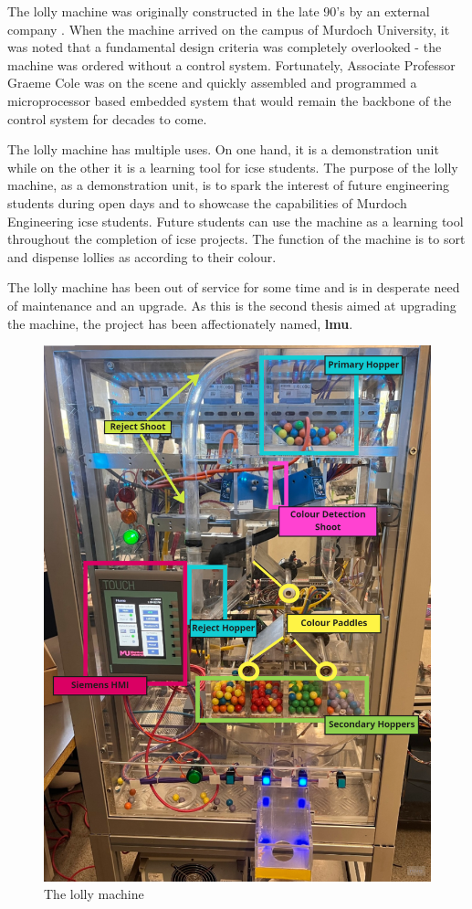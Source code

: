 The lolly machine was originally constructed in the late 90's by an external company \cite{computerControlGCole}. When the machine arrived on the campus of Murdoch University, it was noted that a fundamental design criteria was completely overlooked - the machine was ordered without a control system. Fortunately, Associate Professor Graeme Cole was on the scene and quickly assembled and programmed a microprocessor based embedded system that would remain the backbone of the control system for decades to come. 

The lolly machine has multiple uses. On one hand, it is a demonstration unit while on the other it is a learning tool for \acrshort{icse} students. The purpose of the lolly machine, as a demonstration unit, is to spark the interest of future engineering students during open days and to showcase the capabilities of Murdoch Engineering \acrlong{icse} students. Future students can use the machine as a learning tool throughout the completion of \acrshort{icse} projects. 
The function of the machine is to sort and dispense lollies as according to their colour.

The lolly machine has been out of service for some time and is in desperate need of maintenance and an upgrade. As this is the second thesis aimed at upgrading the machine, the project has been affectionately named, \textbf{\acrfull{lmu}}.

    \begin{figure}[ht]
        \centering
        \includegraphics[scale = 0.5]{2_images/lollyMachine}
        \caption{The lolly machine}
        \label{fig:lollyMachine}
    \end{figure}

